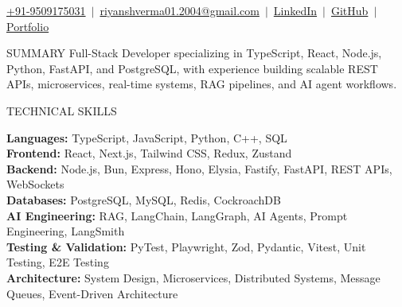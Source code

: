 \documentclass{resume} %
\begin{document}

\vspace{-22pt}

\begin{center}
    {\normalsize
    \href{tel:+919509175031}{+91-9509175031}
    \,${\vert}$\,
    \href{mailto:riyanshverma01.2004@gmail.com}{riyanshverma01.2004@gmail.com}
    \,${\vert}$\,
    \href{https://www.linkedin.com/in/riyansh-verma}{LinkedIn}
    \,${\vert}$\,
    \href{https://github.com/Riyanshverma}{GitHub}
    \,${\vert}$\,
    \href{https://riyansh-portfolio-five.vercel.app/}{Portfolio}
    }
    \\[2pt]
\end{center}

\vspace{-2pt}


\begin{rSection}{SUMMARY}
Full-Stack Developer specializing in TypeScript, React, Node.js, Python, FastAPI, and PostgreSQL, with experience building scalable REST APIs, microservices, real-time systems, RAG pipelines, and AI agent workflows.

\end{rSection}

\vspace{-2pt}


\begin{rSection}{TECHNICAL SKILLS}

\setlength{\parskip}{6pt}
\setlength{\parindent}{2pt}

\textbf{Languages:} TypeScript, JavaScript, Python, C++, SQL \\[2pt]
\textbf{Frontend:} React, Next.js, Tailwind CSS, Redux, Zustand \\[2pt]
\textbf{Backend:} Node.js, Bun, Express, Hono, Elysia, Fastify, FastAPI, REST APIs, WebSockets \\[2pt]
\textbf{Databases:} PostgreSQL, MySQL, Redis, CockroachDB \\[2pt]
\textbf{AI Engineering:} RAG, LangChain, LangGraph, AI Agents, Prompt Engineering, LangSmith \\[2pt]
\textbf{Testing \& Validation:} PyTest, Playwright, Zod, Pydantic, Vitest, Unit Testing, E2E Testing \\[2pt]
\textbf{Architecture:} System Design, Microservices, Distributed Systems, Message Queues, Event-Driven Architecture

\end{rSection}
\end{document}
